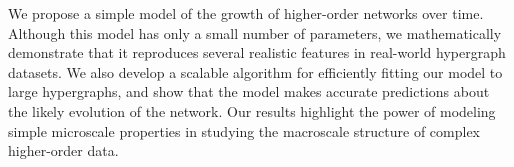 We propose a simple model of the growth of higher-order networks over time.    
    Although this model has only a small number of parameters, we mathematically demonstrate that it reproduces several realistic features in real-world hypergraph datasets. 
    We also develop a scalable algorithm for efficiently fitting our model to large hypergraphs, and show that the model makes accurate predictions about the likely evolution of the network. 
    Our results highlight the power of modeling simple microscale properties in studying the macroscale structure of complex higher-order data. 